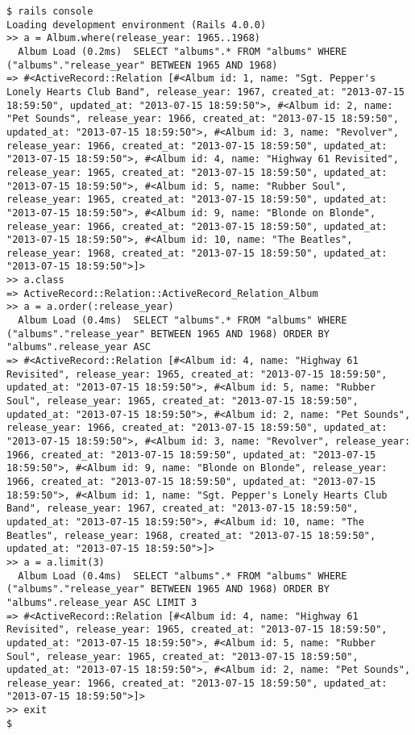 \documentclass[a4paper]{book}
\begin{document}
\begin{shaded}\begin{verbatim}
$ rails console
Loading development environment (Rails 4.0.0)
>> a = Album.where(release_year: 1965..1968)
  Album Load (0.2ms)  SELECT "albums".* FROM "albums" WHERE ("albums"."release_year" BETWEEN 1965 AND 1968)
=> #<ActiveRecord::Relation [#<Album id: 1, name: "Sgt. Pepper's Lonely Hearts Club Band", release_year: 1967, created_at: "2013-07-15 18:59:50", updated_at: "2013-07-15 18:59:50">, #<Album id: 2, name: "Pet Sounds", release_year: 1966, created_at: "2013-07-15 18:59:50", updated_at: "2013-07-15 18:59:50">, #<Album id: 3, name: "Revolver", release_year: 1966, created_at: "2013-07-15 18:59:50", updated_at: "2013-07-15 18:59:50">, #<Album id: 4, name: "Highway 61 Revisited", release_year: 1965, created_at: "2013-07-15 18:59:50", updated_at: "2013-07-15 18:59:50">, #<Album id: 5, name: "Rubber Soul", release_year: 1965, created_at: "2013-07-15 18:59:50", updated_at: "2013-07-15 18:59:50">, #<Album id: 9, name: "Blonde on Blonde", release_year: 1966, created_at: "2013-07-15 18:59:50", updated_at: "2013-07-15 18:59:50">, #<Album id: 10, name: "The Beatles", release_year: 1968, created_at: "2013-07-15 18:59:50", updated_at: "2013-07-15 18:59:50">]>
>> a.class
=> ActiveRecord::Relation::ActiveRecord_Relation_Album
>> a = a.order(:release_year)
  Album Load (0.4ms)  SELECT "albums".* FROM "albums" WHERE ("albums"."release_year" BETWEEN 1965 AND 1968) ORDER BY "albums".release_year ASC
=> #<ActiveRecord::Relation [#<Album id: 4, name: "Highway 61 Revisited", release_year: 1965, created_at: "2013-07-15 18:59:50", updated_at: "2013-07-15 18:59:50">, #<Album id: 5, name: "Rubber Soul", release_year: 1965, created_at: "2013-07-15 18:59:50", updated_at: "2013-07-15 18:59:50">, #<Album id: 2, name: "Pet Sounds", release_year: 1966, created_at: "2013-07-15 18:59:50", updated_at: "2013-07-15 18:59:50">, #<Album id: 3, name: "Revolver", release_year: 1966, created_at: "2013-07-15 18:59:50", updated_at: "2013-07-15 18:59:50">, #<Album id: 9, name: "Blonde on Blonde", release_year: 1966, created_at: "2013-07-15 18:59:50", updated_at: "2013-07-15 18:59:50">, #<Album id: 1, name: "Sgt. Pepper's Lonely Hearts Club Band", release_year: 1967, created_at: "2013-07-15 18:59:50", updated_at: "2013-07-15 18:59:50">, #<Album id: 10, name: "The Beatles", release_year: 1968, created_at: "2013-07-15 18:59:50", updated_at: "2013-07-15 18:59:50">]>
>> a = a.limit(3)
  Album Load (0.4ms)  SELECT "albums".* FROM "albums" WHERE ("albums"."release_year" BETWEEN 1965 AND 1968) ORDER BY "albums".release_year ASC LIMIT 3
=> #<ActiveRecord::Relation [#<Album id: 4, name: "Highway 61 Revisited", release_year: 1965, created_at: "2013-07-15 18:59:50", updated_at: "2013-07-15 18:59:50">, #<Album id: 5, name: "Rubber Soul", release_year: 1965, created_at: "2013-07-15 18:59:50", updated_at: "2013-07-15 18:59:50">, #<Album id: 2, name: "Pet Sounds", release_year: 1966, created_at: "2013-07-15 18:59:50", updated_at: "2013-07-15 18:59:50">]>
>> exit
$
\end{verbatim}\end{shaded}
\end{document}
